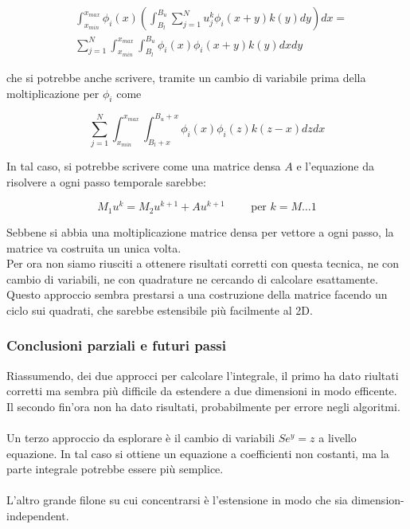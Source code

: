 \documentclass[a4paper,10pt]{article}
\begin{document}
\begin{align*}
 & \int_{x_{min}}^{x_{max}}\phi_i(x)\left( \int_{B_l}^{B_u} \sum_{j=1}^N u_j^k \phi_i(x+y)k(y)dy \right)dx=\\ 
 &\sum_{j=1}^N  \int_{x_{min}}^{x_{max}}\int_{B_l}^{B_u} \phi_i(x)\phi_i(x+y)k(y)dxdy
\end{align*}

che si potrebbe anche scrivere, tramite un cambio di variabile prima della moltiplicazione per $\phi_i$ come

\begin{equation*}
 \sum_{j=1}^N  \int_{x_{min}}^{x_{max}}\int_{B_l+x}^{B_u+x} \phi_i(x)\phi_i(z)k(z-x)dzdx
\end{equation*}

In tal caso, si potrebbe scrivere come una matrice densa $A$ e l'equazione da risolvere a ogni passo temporale sarebbe:

\begin{equation*}
 M_1u^k=M_2u^{k+1}+Au^{k+1}  \qquad \text{ per } k=M\dots1
\end{equation*}

Sebbene si abbia una moltiplicazione matrice densa per vettore a ogni passo, la matrice va costruita un unica volta.\\
Per ora non siamo riusciti a ottenere risultati corretti con questa tecnica, ne con cambio di variabili, ne con quadrature ne cercando di calcolare esattamente. Questo approccio sembra prestarsi a una costruzione della matrice facendo un ciclo sui quadrati, che sarebbe estensibile più facilmente al 2D.

\subsubsection{Conclusioni parziali e futuri passi}

Riassumendo, dei due approcci per calcolare l'integrale, il primo ha dato riultati corretti ma sembra più difficile da estendere a due dimensioni in modo efficente. Il secondo fin'ora non ha dato risultati, probabilmente per errore negli algoritmi.\\ \\
Un terzo approccio da esplorare è il cambio di variabili $Se^y=z$ a livello equazione. In tal caso si ottiene un equazione a coefficienti non costanti, ma la parte integrale potrebbe essere più semplice.
\\ \\
L'altro grande filone su cui concentrarsi è l'estensione in modo che sia dimension-independent.
\end{document}
